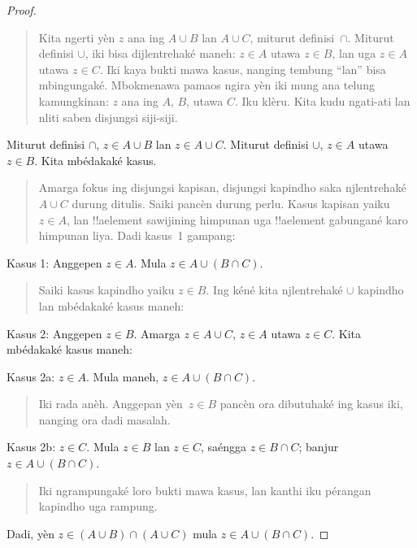 \documentclass[../../../include/open-logic-section]{subfiles}
\begin{document}
\begin{proof}
\begin{quote}
Kita ngerti yèn $z$ ana ing $A \cup B$ lan
$A \cup C$, miturut definisi~$\cap$. Miturut definisi
$\cup$, iki bisa dijlentrehaké maneh: $z \in A$
utawa $z \in B$, lan uga $z \in A$ utawa $z \in
C$. Iki kaya bukti mawa kasus, nanging tembung ``lan''
bisa mbingungaké. Mbokmenawa pamaos ngira yèn
iki mung ana telung kamungkinan: $z$ ana ing $A$, $B$,
utawa $C$. Iku klèru. Kita kudu ngati-ati lan nliti
saben disjungsi siji-siji.
\end{quote}
Miturut definisi $\cap$, $z \in A \cup B$ lan
$z \in A \cup C$. Miturut definisi $\cup$,
$z \in A$ utawa $z \in B$. Kita mbédakaké kasus.
\begin{quote}
Amarga fokus ing disjungsi kapisan, disjungsi kapindho
saka njlentrehaké $A \cup C$ durung ditulis.
Saiki pancèn durung perlu. Kasus kapisan yaiku
$z \in A$, lan !!a{element} sawijining himpunan
uga !!a{element} gabungané karo himpunan liya.
Dadi kasus~1 gampang:
\end{quote}
Kasus 1: Anggepen $z \in A$. Mula
$z \in A \cup (B \cap
C)$.
\begin{quote}
Saiki kasus kapindho yaiku $z \in B$.
Ing kéné kita njlentrehaké $\cup$ kapindho lan
mbédakaké kasus maneh:
\end{quote}
Kasus 2: Anggepen $z \in B$. Amarga $z \in A \cup C$,
$z \in A$ utawa $z \in C$. Kita mbédakaké kasus maneh:

Kasus 2a: $z \in A$. Mula maneh,
$z \in A \cup (B \cap C)$.
\begin{quote}
Iki rada anèh. Anggepan yèn~$z \in B$ pancèn ora
dibutuhaké ing kasus iki, nanging ora dadi masalah.
\end{quote}
Kasus 2b: $z \in C$. Mula $z \in B$ lan $z \in C$,
saéngga $z \in B \cap C$; banjur
$z \in A \cup (B \cap C)$.
\begin{quote}
Iki ngrampungaké loro bukti mawa kasus, lan kanthi
iku pérangan kapindho uga rampung.
\end{quote}
Dadi, yèn $z \in (A \cup B) \cap (A \cup C)$ mula
$z \in A \cup (B \cap C)$.
\end{proof}
\end{document}
